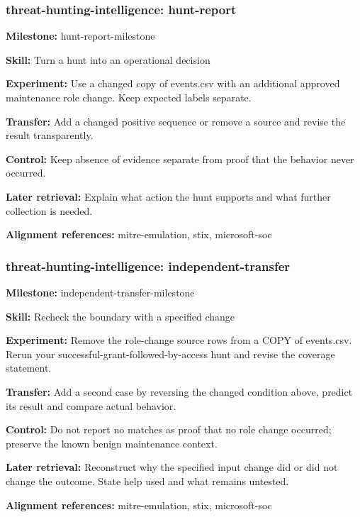 \subsubsection{threat-hunting-intelligence: hunt-report}
\noindent\textbf{Milestone:} hunt-report-milestone\par
\noindent\textbf{Skill:} Turn a hunt into an operational decision\par
\noindent\textbf{Experiment:} Use a changed copy of events.csv with an additional approved maintenance role change. Keep expected labels separate.\par
\noindent\textbf{Transfer:} Add a changed positive sequence or remove a source and revise the result transparently.\par
\noindent\textbf{Control:} Keep absence of evidence separate from proof that the behavior never occurred.\par
\noindent\textbf{Later retrieval:} Explain what action the hunt supports and what further collection is needed.\par
\noindent\textbf{Alignment references:} mitre-emulation, stix, microsoft-soc\par
\subsubsection{threat-hunting-intelligence: independent-transfer}
\noindent\textbf{Milestone:} independent-transfer-milestone\par
\noindent\textbf{Skill:} Recheck the boundary with a specified change\par
\noindent\textbf{Experiment:} Remove the role-change source rows from a COPY of events.csv. Rerun your successful-grant-followed-by-access hunt and revise the coverage statement.\par
\noindent\textbf{Transfer:} Add a second case by reversing the changed condition above, predict its result and compare actual behavior.\par
\noindent\textbf{Control:} Do not report no matches as proof that no role change occurred; preserve the known benign maintenance context.\par
\noindent\textbf{Later retrieval:} Reconstruct why the specified input change did or did not change the outcome. State help used and what remains untested.\par
\noindent\textbf{Alignment references:} mitre-emulation, stix, microsoft-soc\par
